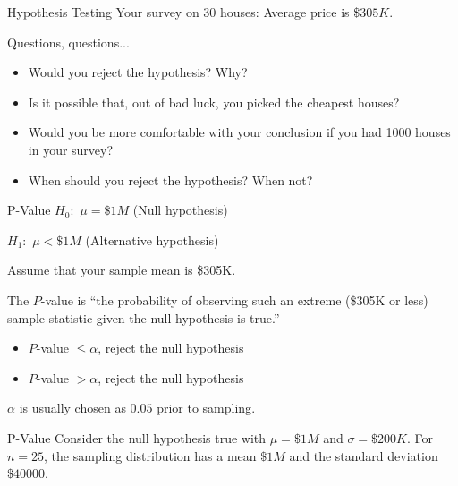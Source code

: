 \documentclass{beamer}\usepackage[]{graphicx}\usepackage[]{color}
\begin{document}
\begin{darkframes}
\begin{frame}[label=lists]{Hypothesis Testing}
    Your survey on 30 houses: Average price is \$$305K$. \newline
    
    Questions, questions...
    \begin{itemize}
   \item Would you reject the hypothesis? Why?
    
   \item Is it possible that, out of bad luck, you picked the cheapest houses?
    
   \item Would you be more comfortable with your conclusion if you had 1000 houses in your survey?
    
   \item When should you reject the hypothesis? When not?
    
   \end{itemize}


	\end{frame}
	
	
	\begin{frame}[label=lists]{P-Value}
		$H_0:$ $\mu=\$1M$	(Null hypothesis)
		
		$H_1:$ $\mu<\$1M$	(Alternative hypothesis)
		
		Assume that your sample mean is \$305K. \newline
		
		The \alert{$P$-value} is ``the probability of observing such an extreme (\$305K or less) sample statistic given the null hypothesis is true.''
		
		\begin{itemize}
		\item $P$-value  $\leq \alpha$, reject the null hypothesis
		\item $P$-value  $> \alpha$, reject the null hypothesis
		
		\end{itemize}	
		
		$\alpha$ is usually chosen as $0.05$ \underline{prior to sampling}.		
		

	\end{frame}
	
	
	\begin{frame}[label=lists]{P-Value}
		Consider the null hypothesis true with $\mu=\$1M$ and $\sigma=\$200K$. For $n=25$, the sampling distribution has a mean $\$1M$ and the standard deviation $\$40000$. \newline
		

\end{frame}
\end{darkframes}
\end{document}

